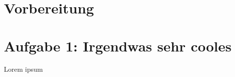 \section*{\textcolor{umitblau!75}{Vorbereitung}}
\section*{Aufgabe 1: Irgendwas sehr cooles}

Lorem ipsum \cite{parallax_servo_90000008}
